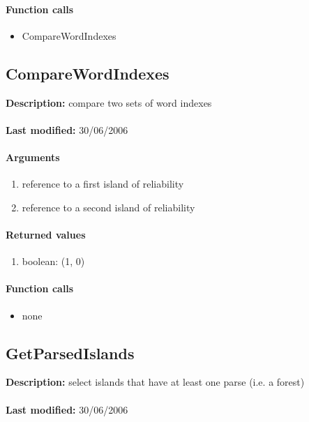 \paragraph{Function calls}
\begin{itemize}
\item CompareWordIndexes
\end{itemize}

\subsection{CompareWordIndexes}
\textbf{Description:} compare two sets of word indexes\\
\\\textbf{Last modified:} 30/06/2006

\paragraph{Arguments}
\begin{enumerate}
\item reference to a first island of reliability
\item reference to a second island of reliability
\end{enumerate}

\paragraph{Returned values}
\begin{enumerate}
\item boolean: (1, 0)
\end{enumerate}

\paragraph{Function calls}
\begin{itemize}
\item none
\end{itemize}

\subsection{GetParsedIslands}
\textbf{Description:} select islands that have at least one parse (i.e. a forest)\\
\\\textbf{Last modified:} 30/06/2006

